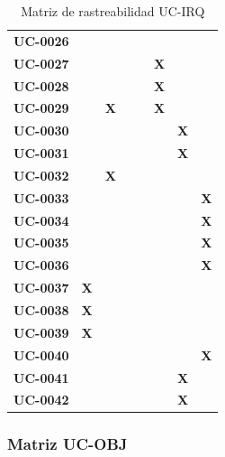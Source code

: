 \begin{table}[H]
\begin{tabular}{p{1.5cm}p{0.5cm}p{0.5cm}p{0.5cm}p{0.5cm}p{0.5cm}p{0.5cm}p{0.5cm}}
\textbf{UC-0026} &  &  &  &  &  &  &  \\
\textbf{UC-0027} &  &  &  &  & \textbf{X} &  &  \\
\textbf{UC-0028} &  &  &  &  & \textbf{X} &  &  \\
\textbf{UC-0029} &  & \textbf{X} &  &  & \textbf{X} &  &  \\
\textbf{UC-0030} &  &  &  &  &  & \textbf{X} &  \\
\textbf{UC-0031} &  &  &  &  &  & \textbf{X} &  \\
\textbf{UC-0032} &  & \textbf{X} &  &  &  &  &  \\
\textbf{UC-0033} &  &  &  &  &  &  & \textbf{X} \\
\textbf{UC-0034} &  &  &  &  &  &  & \textbf{X} \\
\textbf{UC-0035} &  &  &  &  &  &  & \textbf{X} \\
\textbf{UC-0036} &  &  &  &  &  &  & \textbf{X} \\
\textbf{UC-0037} & \textbf{X} &  &  &  &  &  &  \\
\textbf{UC-0038} & \textbf{X} &  &  &  &  &  &  \\
\textbf{UC-0039} & \textbf{X} &  &  &  &  &  &  \\
\textbf{UC-0040} &  &  &  &  &  &  & \textbf{X} \\
\textbf{UC-0041} &  &  &  &  &  & \textbf{X} &  \\
\textbf{UC-0042} &  &  &  &  &  & \textbf{X} &  \\
\hline
\end{tabular}
\caption{Matriz de rastreabilidad UC-IRQ}
\label{fig:matriz-uc-irq}
\end{table}


\subsubsection{Matriz UC-OBJ}

